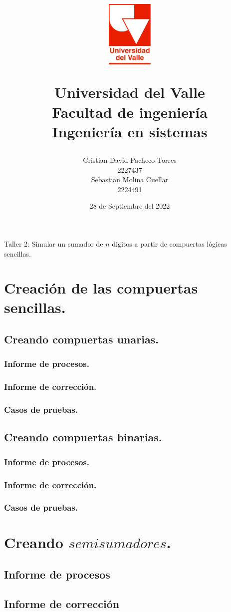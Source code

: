 \documentclass[12pt, a4paper]{article}
\title{
  \begin{figure}[th]
    \centering
    \includegraphics[width=0.2\textwidth]{Univalle}
  \end{figure}
  \textbf{Universidad del Valle
    \\{\Large Facultad de ingeniería}
  \\{\large Ingeniería en sistemas}}}
\author{Cristian David Pacheco Torres
  \\ 2227437
  \\ Sebastian Molina Cuellar
  \\ 2224491}
\date{28 de Septiembre del 2022}
\begin{document}
\maketitle
Taller 2: Simular un sumador de $n$ digitos a partir de compuertas lógicas sencillas.
\newpage{}
\tableofcontents
\newpage{}
\section{Creación de las compuertas sencillas.}
\subsection{Creando compuertas unarias.}
\subsubsection{Informe de procesos.}
\subsubsection{Informe de corrección.}
\subsubsection{Casos de pruebas.}
\subsection{Creando compuertas binarias.}
\subsubsection{Informe de procesos.}
\subsubsection{Informe de corrección.}
\subsubsection{Casos de pruebas.}
\section{Creando $semisumadores$.}
\subsection{Informe de procesos}
\subsection{Informe de corrección}
\end{document}
